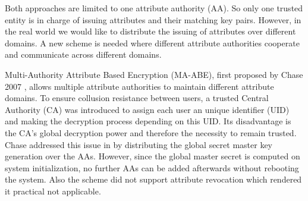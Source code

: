 \documentclass[twocolumn]{article}
\begin{document}
Both approaches are limited to one attribute authority (AA). So only one trusted entity is in charge of issuing attributes and their matching key pairs. However, in the real world we would like to distribute the issuing of attributes over different domains. A new scheme is needed where different attribute authorities cooperate and communicate across different domains.  


Multi-Authority Attribute Based Encryption (MA-ABE), first proposed by Chase 2007 \cite{chase2007multi}, allows multiple attribute authorities to maintain different attribute domains. To ensure collusion resistance between users, a trusted  Central Authority (CA) was introduced to assign each user an unique identifier (UID) and making the decryption process depending on this UID. Its disadvantage is the CA's global decryption power and therefore the necessity to remain trusted. 
Chase addressed this issue in \cite{chase2009improving} by distributing the global secret  master key generation over the AAs. However, since the global master secret is computed on system initialization, no further AAs can be added afterwards without rebooting the system. Also the scheme did not support attribute revocation which rendered it practical not applicable.
\end{document}
